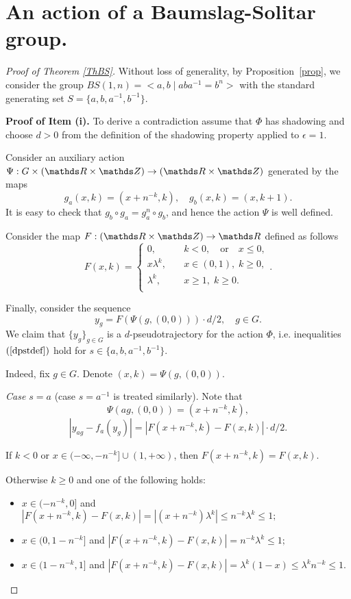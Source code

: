 \section{An action of a Baumslag-Solitar group.}

\begin{proof}[Proof of Theorem \ref{ThBS}]

Without loss of generality, by Proposition~\ref{prop}, we consider the group $BS(1,n)=<a,b\mid aba^{-1}=b^n>$ with the standard generating set $S=\{a,b,a^{-1},b^{-1}\}$.

\textbf{Proof of Item (i).} To derive a contradiction assume that $\Phi$ has shadowing and choose $d > 0$ from the definition of the shadowing property applied to $\epsilon=1$.

Consider an auxiliary action $\Psi:  G \times (\RR \times \ZZ) \to (\RR \times \ZZ)$ generated by the maps
$$
g_a(x, k) = (x + n^{-k}, k), \quad g_b(x, k) = (x, k+1).
$$
It is easy to check that $g_b \circ g_a = g_a^n \circ g_b$, and hence the action $\Psi$ is well defined.


Consider the map $F : (\RR \times \ZZ) \to \RR$ defined as follows
$$
F(x, k) =
  \begin{cases}
  0, & \quad k <0, \quad \mbox{or} \quad x \leq 0,\\
  x \lambda^k, & \quad x \in (0, 1), \; k \geq 0,\\
  \lambda^k, & \quad x \geq 1, \; k \geq 0.\\
  \end{cases}.
$$

Finally, consider the sequence
$$
y_g = F(\Psi(g, (0, 0))) \cdot d/2, \quad g \in G.
$$
We claim that $\{y_g\}_{g\in G}$ is a $d$-pseudotrajectory for the action $\Phi$, i.e. inequalities $(\ref{dpstdef})$ hold for $s\in \{a,b,a^{-1},b^{-1}\}$.

Indeed, fix $g \in G$. Denote $(x, k) = \Psi(g, (0, 0))$.

\textit{Case $s = a$} (case $s=a^{-1}$ is treated similarly). Note that $$\Psi(ag, (0, 0)) = (x + n^{-k}, k),$$
$$
|y_{ag} - f_a(y_g)| = |F(x + n^{-k}, k) - F(x, k)|\cdot d/2.
$$

If $k < 0$ or $x \in (-\infty, -n^{-k}] \cup (1, +\infty)$, then
$
F(x + n^{-k}, k) = F(x, k).
$

Otherwise $k \geq 0$ and one of the following holds:
\begin{itemize}
\item $x \in (-n^{-k}, 0]$ and $|F(x + n^{-k}, k) - F(x, k)| = |(x+n^{-k})\lambda^k|\leq n^{-k}\lambda^k \leq 1;$
\item $x \in (0, 1- n^{-k}]$ and
$|F(x + n^{-k}, k) - F(x, k)| = n^{-k}\lambda^{k}\leq 1;$
\item $x \in (1- n^{-k}, 1]$ and $|F(x + n^{-k}, k) - F(x, k)| = \lambda^k (1-x)\leq \lambda^k n^{-k}\leq 1.$
\end{itemize}


\end{proof}
